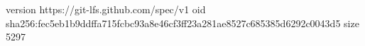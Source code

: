 version https://git-lfs.github.com/spec/v1
oid sha256:fec5eb1b9ddffa715fcbc93a8e46cf3ff23a281ae8527c685385d6292c0043d5
size 5297
